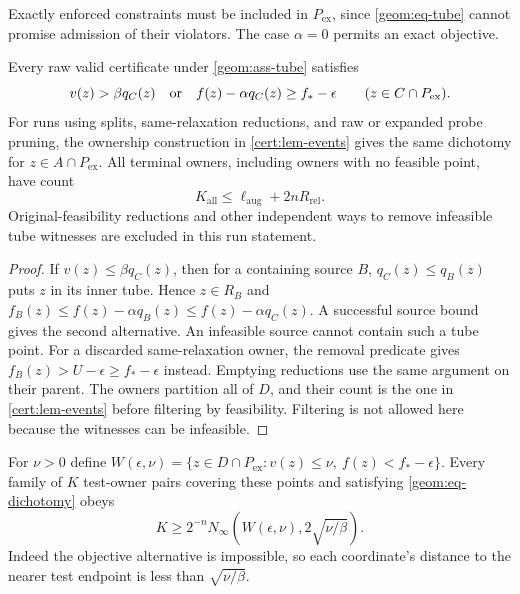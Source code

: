 Exactly enforced constraints must be included in $P_{\mathrm{ex}}$,
since \cref{geom:eq-tube} cannot promise admission of their violators.
The case $\alpha=0$ permits an exact objective.

\begin{lemma}\label{geom:lem-tube-events}
Every raw valid certificate under \cref{geom:ass-tube} satisfies
\begin{equation}\label{geom:eq-dichotomy}
 v(z)>\beta q_C(z)\quad\hbox{or}\quad
 f(z)-\alpha q_C(z)\geq f_*-\epsilon
                  \qquad(z\in C\cap P_{\mathrm{ex}}).
\end{equation}
For runs using splits, same-relaxation reductions, and raw or expanded
probe pruning, the ownership construction in \cref{cert:lem-events}
gives the same dichotomy for $z\in A\cap P_{\mathrm{ex}}$.
All terminal owners, including owners with no feasible point, have count
\begin{equation}\label{geom:eq-all-owners}
 K_{\mathrm{all}}\leq\ell_{\mathrm{aug}}+2nR_{\mathrm{rel}}.
\end{equation}
Original-feasibility reductions and other independent ways to remove
infeasible tube witnesses are excluded in this run statement.
\end{lemma}
\begin{proof}
If $v(z)\leq\beta q_C(z)$, then for a containing source $B$,
$q_C(z)\leq q_B(z)$ puts $z$ in its inner tube. Hence $z\in R_B$ and
$f_B(z)\leq f(z)-\alpha q_B(z)\leq f(z)-\alpha q_C(z)$.
A successful source bound gives the second alternative. An infeasible
source cannot contain such a tube point. For a discarded
same-relaxation owner, the removal predicate gives
$f_B(z)>U-\epsilon\geq f_*-\epsilon$ instead. Emptying reductions use
the same argument on their parent. The owners partition all of $D$,
and their count is the one in \cref{cert:lem-events} before filtering by
feasibility. Filtering is not allowed here because the witnesses can
be infeasible.
\end{proof}

For $\nu>0$ define
$W(\epsilon,\nu)=\{z\in D\cap P_{\mathrm{ex}}:
v(z)\leq\nu,\ f(z)<f_*-\epsilon\}$.
Every family of $K$ test-owner pairs covering these points and satisfying
\cref{geom:eq-dichotomy} obeys
\begin{equation}\label{geom:eq-infeasible-cover}
 K\geq2^{-n}N_\infty(W(\epsilon,\nu),2\sqrt{\nu/\beta}).
\end{equation}
Indeed the objective alternative is impossible, so each coordinate's
distance to the nearer test endpoint is less than $\sqrt{\nu/\beta}$.

